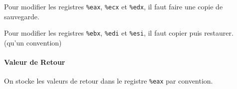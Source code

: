Pour modifier les registres \texttt{\%eax}, \texttt{\%ecx} et
\texttt{\%edx}, il faut faire une copie de sauvegarde.

Pour modifier les registres \texttt{\%ebx}, \texttt{\%edi} et
\texttt{\%esi}, il faut copier puis restaurer. (qu'un convention)

\paragraph{Valeur de Retour}\label{valeur-de-retour}

On stocke les valeurs de retour dans le registre \texttt{\%eax} par
convention.
